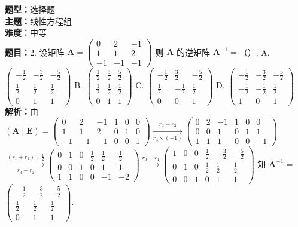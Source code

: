 \documentclass{ctexart}
\newenvironment{question}[5]{%
	\noindent\textbf{题型：}#1\\
	\textbf{主题：}#2\\
	\textbf{难度：}#3\\
	\textbf{题目：}#4\\
	\textbf{解析：}#5\\
	\vspace{1em}
}{}
\begin{document}
	
	\begin{question}
		{选择题}
		{线性方程组}
		{中等}
		{2. 设矩阵 \(\mathbf{A}=\left(\begin{array}{ccc}0 & 2 & -1 \\ 1 & 1 & 2 \\ -1 & -1 & -1\end{array}\right)\) 则 \(\mathbf{A}\) 的逆矩阵 \(\mathbf{A}^{-1}=\)（）. 
			A. \(\left(\begin{array}{ccc}-\frac{1}{2} & -\frac{3}{2} & -\frac{5}{2} \\ \frac{1}{2} & \frac{1}{2} & \frac{1}{2} \\ 0 & 1 & 1\end{array}\right)\)
			B. \(\left(\begin{array}{ccc}\frac{1}{2} & \frac{3}{2} & \frac{5}{2} \\ \frac{1}{2} & \frac{1}{2} & \frac{1}{2} \\ 0 & 1 & 1\end{array}\right)\)
			C. \(\left(\begin{array}{ccc}-\frac{1}{2} & \frac{3}{2} & -\frac{5}{2} \\ \frac{1}{2} & -\frac{1}{2} & \frac{1}{2} \\ 0 & 0 & 1\end{array}\right)\)
			D. \(\left(\begin{array}{ccc}-\frac{1}{2} & -\frac{3}{2} & -\frac{5}{2} \\ -\frac{1}{2} & -\frac{1}{2} & \frac{1}{2} \\ 1 & 0 & 1\end{array}\right)\)}
		{由 \((\mathbf{A} \mid \mathbf{E})=\left(\begin{array}{ccc|ccc}0 & 2 & -1 & 1 & 0 & 0 \\ 1 & 1 & 2 & 0 & 1 & 0 \\ -1 & -1 & -1 & 0 & 0 & 1\end{array}\right) \xrightarrow[r_3 \times(-1)]{r_2+r_3}\left(\begin{array}{ccc|ccc}0 & 2 & -1 & 1 & 0 & 0 \\ 0 & 0 & 1 & 0 & 1 & 1 \\ 1 & 1 & 1 & 0 & 0 & -1\end{array}\right)\)
			\(\xrightarrow[r_3-r_2]{\left(r_1+r_2\right) \times \frac{1}{2}}\left(\begin{array}{ccc|ccc}0 & 1 & 0 & \frac{1}{2} & \frac{1}{2} & \frac{1}{2} \\ 0 & 0 & 1 & 0 & 1 & 1 \\ 1 & 1 & 0 & 0 & -1 & -2\end{array}\right) \xrightarrow{r_3-r_1}\left(\begin{array}{ccc|ccc}1 & 0 & 0 & \frac{1}{2} & -\frac{3}{2} & -\frac{5}{2} \\ 0 & 1 & 0 & \frac{1}{2} & \frac{1}{2} & \frac{1}{2} \\ 0 & 0 & 1 & 0 & 1 & 1\end{array}\right)\) 知 \(\mathbf{A}^{-1}=\) \(\left(\begin{array}{ccc}-\frac{1}{2} & -\frac{3}{2} & -\frac{5}{2} \\ \frac{1}{2} & \frac{1}{2} & \frac{1}{2} \\ 0 & 1 & 1\end{array}\right)\). }

\end{question}
\end{document}
